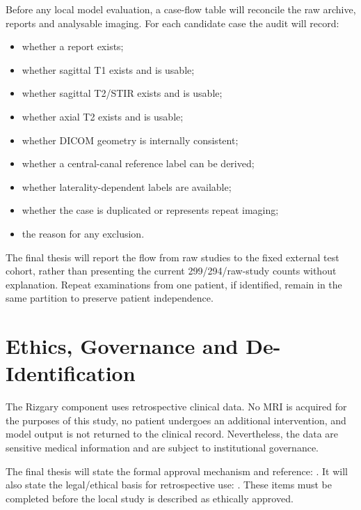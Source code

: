 Before any local model evaluation, a case-flow table will reconcile the raw
archive, reports and analysable imaging. For each candidate case the audit will
record:

\begin{itemize}
  \item whether a report exists;
  \item whether sagittal T1 exists and is usable;
  \item whether sagittal T2/STIR exists and is usable;
  \item whether axial T2 exists and is usable;
  \item whether DICOM geometry is internally consistent;
  \item whether a central-canal reference label can be derived;
  \item whether laterality-dependent labels are available;
  \item whether the case is duplicated or represents repeat imaging;
  \item the reason for any exclusion.
\end{itemize}

The final thesis will report the flow from raw studies to the fixed external
test cohort, rather than presenting the current 299/294/raw-study counts without
explanation. Repeat examinations from one patient, if identified, remain in the
same partition to preserve patient independence.

\section{Ethics, Governance and De-Identification}
\label{sec:method-ethics}

The Rizgary component uses retrospective clinical data. No MRI is acquired for
the purposes of this study, no patient undergoes an additional intervention, and
model output is not returned to the clinical record. Nevertheless, the data are
sensitive medical information and are subject to institutional governance.

The final thesis will state the formal approval mechanism and reference:
. It will also state the legal/ethical basis for retrospective use:
. These items
must be completed before the local study is described as ethically approved.


